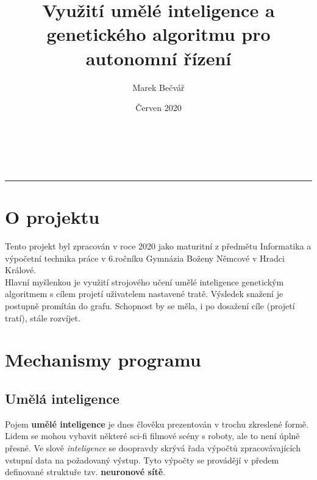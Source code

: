 \documentclass[a4paper,12pt]{article}
\title{Využití umělé inteligence a genetického algoritmu pro autonomní řízení}
\author{Marek Bečvář}
\date{Červen 2020}
\renewcommand{\maketitle}
{
    \begin{center}
        \vspace*{0cm}
        \LARGE{\textbf{\thetitle}}\\
        \vspace{0.5cm}
        \Large{\textbf{\theauthor}}\\
        \vspace{0.5cm}
        \normalsize{\thedate}
        \vspace{0.2cm}
        \hrule
    \end{center}
}
\newcommand{\tab}
{
    \hspace*{1em}
}
\begin{document}
    \maketitle

    \vspace{0.25cm}
    \section{O projektu}
        \tab Tento projekt byl zpracován v roce 2020 jako maturitní z předmětu Informatika 
        a výpočetní technika práce v 6.ročníku Gymnázia Boženy Němcové v Hradci Králové.\\
        \tab Hlavní myšlenkou je využití strojového učení umělé inteligence genetickým 
        algoritmem s cílem projetí uživatelem nastavené tratě. Výsledek snažení 
        je postupně promítán do grafu. Schopnost by se měla, i po dosažení cíle (projetí tratí),
        stále rozvíjet.

    \section{Mechanismy programu}
    \subsection{Umělá inteligence}
        Pojem \textbf{umělé inteligence} je dnes člověku prezentován v trochu zkreslené formě.
        Lidem se mohou vybavit některé sci-fi filmové scény s roboty, ale to není úplně přesné.
        Ve slově \textit{inteligence} se doopravdy skrývá řada výpočtů zpracovávajících \\vstupní data 
        na požadovaný výstup. Tyto výpočty se provádějí v předem definované 
        struktuře tzv. \textbf{neuronové sítě}.\\
            
\end{document}
